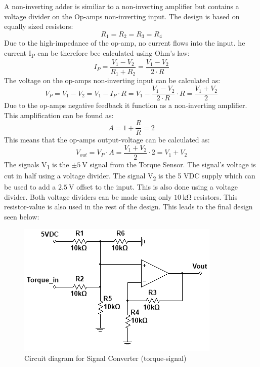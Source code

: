 A non-inverting adder is similiar to a non-inverting amplifier but contains a voltage divider on the Op-amps non-inverting input. The design is based on equally sized resistors:
\begin{equation}
	R_1 = R_2 = R_3 = R_4
\end{equation}
Due to the high-impedance of the op-amp, no current flows into the input. he current I\textsubscript{P} can be therefore bee calculated using Ohm's law:
\begin{equation}
	I_P = \frac{V_1 - V_2}{R_1 + R_2} = \frac{V_1 - V_2}{2 \cdot R}
\end{equation}
The voltage on the op-amps non-inverting input can be calculated as:
\begin{equation}
	V_P = V_1 - V_2 = V_1 - I_P \cdot R = V_1 - \frac{V_1 - V_2}{2 \cdot R} \cdot R = \frac{V_1 + V_2}{2}
\end{equation}
Due to the op-amps negative feedback it function as a non-inverting amplifier. This amplification can be found as:
\begin{equation}
	A = 1 + \frac{R}{R} = 2
\end{equation}
This means that the op-amps output-voltage can be calculated as:
\begin{equation}
	V_{out} = V_P \cdot A = \frac{V_1 + V_2}{2} \cdot 2 = V_1 + V_2
\end{equation}
The signals V\textsubscript{1} is the $\pm \SI{5}{\volt}$ signal from the Torque Sensor. The signal's voltage is cut in half using a voltage divider. The signal V\textsubscript{2} is the 5 VDC supply which can be used to add a $\SI{2.5}{\volt}$ offset to the input. This is also done using a voltage divider. Both voltage dividers can be made using only $\SI{10}{\kilo \ohm}$ resistors. This resistor-value is also used in the rest of the design. This leads to the final design seen below:

\begin{figure}[H]
	\centering
	\includegraphics[width=0.5\linewidth]{Hardware/SignalConverter/TorqueDesign2}
	\caption{Circuit diagram for Signal Converter (torque-signal)}
	\label{fig:SignalConverterTorque2}
\end{figure}